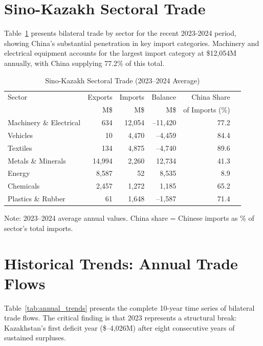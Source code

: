 \documentclass[12pt]{article}
\begin{document}
\section{Sino-Kazakh Sectoral Trade}

Table~\ref{tab:china_sectoral} presents bilateral trade by sector for the recent 2023-2024 period, showing China's substantial penetration in key import categories. Machinery and electrical equipment accounts for the largest import category at \$12,054M annually, with China supplying 77.2\% of this total.

\begin{table}[H]
\centering
\small
\caption{Sino-Kazakh Sectoral Trade (2023--2024 Average)}
\label{tab:china_sectoral}
\begin{tabular}{lrrrrr}
\toprule
Sector & Exports & Imports & Balance & China Share \\
 & M\$ & M\$ & M\$ & of Imports (\%) \\
\midrule
Machinery \& Electrical & 634 & 12,054 & --11,420 & 77.2 \\
Vehicles & 10 & 4,470 & --4,459 & 84.4 \\
Textiles & 134 & 4,875 & --4,740 & 89.6 \\
Metals \& Minerals & 14,994 & 2,260 & 12,734 & 41.3 \\
Energy & 8,587 & 52 & 8,535 & 8.9 \\
Chemicals & 2,457 & 1,272 & 1,185 & 65.2 \\
Plastics \& Rubber & 61 & 1,648 & --1,587 & 71.4 \\
\bottomrule
\end{tabular}
\footnotesize
Note: 2023--2024 average annual values. China share = Chinese imports as \% of sector's total imports.
\end{table}

\section{Historical Trends: Annual Trade Flows}

Table~\ref{tab:annual_trends} presents the complete 10-year time series of bilateral trade flows. The critical finding is that 2023 represents a structural break: Kazakhstan's first deficit year (\$--4,026M) after eight consecutive years of sustained surpluses.
\end{document}
